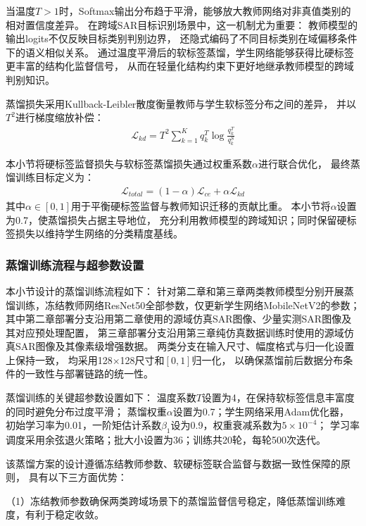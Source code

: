当温度$T>1$时，Softmax输出分布趋于平滑，能够放大教师网络对非真值类别的相对置信度差异。
在跨域SAR目标识别场景中，这一机制尤为重要：
教师模型的输出logits不仅反映目标类别判别边界，
还隐式编码了不同目标类别在域偏移条件下的语义相似关系。
通过温度平滑后的软标签蒸馏，学生网络能够获得比硬标签更丰富的结构化监督信号，
从而在轻量化结构约束下更好地继承教师模型的跨域判别知识。

蒸馏损失采用Kullback-Leibler散度衡量教师与学生软标签分布之间的差异，
并以$T^2$进行梯度缩放补偿：
\begin{gather}
\mathcal{L}_{kd} = T^2 \sum_{k=1}^{K} q_k^T \log \frac{q_k^T}{q_k^S}
\end{gather}

本小节将硬标签监督损失与软标签蒸馏损失通过权重系数$\alpha$进行联合优化，
最终蒸馏训练目标定义为：
\begin{gather}
\mathcal{L}_{total} = (1-\alpha)\mathcal{L}_{ce} + \alpha\mathcal{L}_{kd}
\end{gather}
其中$\alpha\in[0,1]$用于平衡硬标签监督与教师知识迁移的贡献比重。
本小节将$\alpha$设置为0.7，使蒸馏损失占据主导地位，
充分利用教师模型的跨域知识；同时保留硬标签损失以维持学生网络的分类精度基线。



\subsubsection{蒸馏训练流程与超参数设置}

本小节设计的蒸馏训练流程如下：
针对第二章和第三章两类教师模型分别开展蒸馏训练，冻结教师网络ResNet50全部参数，仅更新学生网络MobileNetV2的参数；
其中第二章部署分支沿用第二章使用的源域仿真SAR图像、少量实测SAR图像及其对应预处理配置，
第三章部署分支沿用第三章纯仿真数据训练时使用的源域仿真SAR图像及其像素级增强数据。
两类分支在输入尺寸、幅度格式与归一化设置上保持一致，
均采用128$\times$128尺寸和$[0,1]$归一化，
以确保蒸馏前后数据分布条件的一致性与部署链路的统一性。

蒸馏训练的关键超参数设置如下：
温度系数$T$设置为4，在保持软标签信息丰富度的同时避免分布过度平滑；
蒸馏权重$\alpha$设置为0.7；学生网络采用Adam优化器，
初始学习率为0.01，一阶矩估计系数$\beta_1$设为0.9，权重衰减系数为$5\times10^{-4}$；
学习率调度采用余弦退火策略；批大小设置为36；训练共20轮，每轮500次迭代。

该蒸馏方案的设计遵循冻结教师参数、软硬标签联合监督与数据一致性保障的原则，
具有以下三方面优势：

（1）冻结教师参数确保两类跨域场景下的蒸馏监督信号稳定，降低蒸馏训练难度，有利于稳定收敛。

